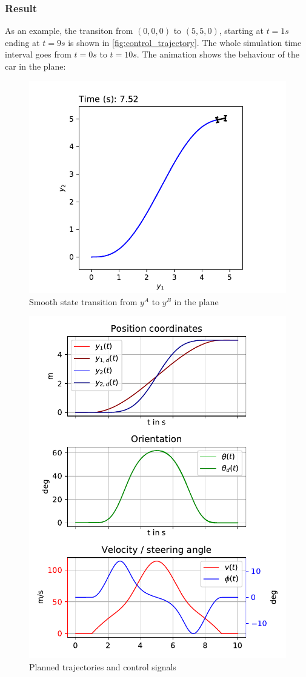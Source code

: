 \documentclass[a4paper,11pt,headings=standardclasses,parskip=half]{scrartcl}
\begin{document}
\subsubsection{Result}
As an example, the transiton from $(0, 0, 0)$ to $(5, 5, 0)$, starting at $t=1s$ ending at $t=9s$ is shown in \autoref{fig:control_trajectory}. The whole simulation time interval goes from $t=0s$ to $t=10s$.
The animation shows the behaviour of the car in the plane:
\begin{figure}[ht]
\centering
\includegraphics[scale=1]{img/plane_trajectory.pdf}
\caption{Smooth state transition from $y^A$ to $y^B$ in the plane}
\label{fig:plane_trajectory}
\end{figure}
\begin{figure}[ht]
\centering
\includegraphics[scale=1]{img/control_trajectory.pdf}
\caption{Planned trajectories and control signals}
\label{fig:control_trajectory}
\end{figure}
\printglossaries
\end{document}
